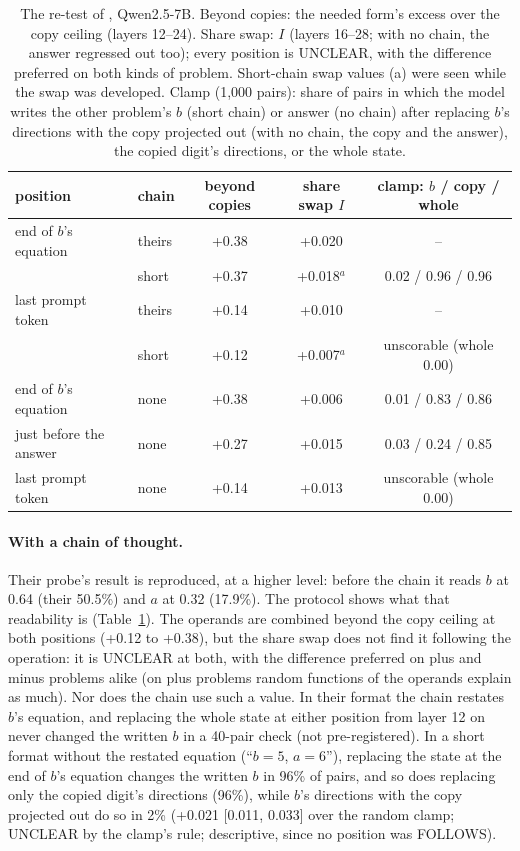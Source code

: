 \documentclass{article}
\begin{document}
\begin{table}[t]
\centering
\caption{The re-test of \citet{kudo2026}, Qwen2.5-7B. Beyond copies: the needed form's excess over the copy ceiling (layers 12--24). Share swap: $I$ (layers 16--28; with no chain, the answer regressed out too); every position is UNCLEAR, with the difference preferred on both kinds of problem. Short-chain swap values (a) were seen while the swap was developed. Clamp (1,000 pairs): share of pairs in which the model writes the other problem's $b$ (short chain) or answer (no chain) after replacing $b$'s directions with the copy projected out (with no chain, the copy and the answer), the copied digit's directions, or the whole state.}
\label{tab:kudo}
\small
\begin{tabular}{@{}llccc@{}}
\toprule
position & chain & beyond copies & share swap $I$ & clamp: $b$ / copy / whole \\
\midrule
end of $b$'s equation & theirs & +0.38 & +0.020 & -- \\
 & short & +0.37 & +0.018$^a$ & 0.02 / 0.96 / 0.96 \\
last prompt token & theirs & +0.14 & +0.010 & -- \\
 & short & +0.12 & +0.007$^a$ & unscorable (whole 0.00) \\
\midrule
end of $b$'s equation & none & +0.38 & +0.006 & 0.01 / 0.83 / 0.86 \\
just before the answer & none & +0.27 & +0.015 & 0.03 / 0.24 / 0.85 \\
last prompt token & none & +0.14 & +0.013 & unscorable (whole 0.00) \\
\bottomrule
\end{tabular}
\end{table}

\paragraph{With a chain of thought.} Their probe's result is reproduced, at a higher level: before the chain it reads $b$ at 0.64 (their 50.5\%) and $a$ at 0.32 (17.9\%). The protocol shows what that readability is (Table~\ref{tab:kudo}). The operands are combined beyond the copy ceiling at both positions (+0.12 to +0.38), but the share swap does not find it following the operation: it is UNCLEAR at both, with the difference preferred on plus and minus problems alike (on plus problems random functions of the operands explain as much). Nor does the chain use such a value. In their format the chain restates $b$'s equation, and replacing the whole state at either position from layer 12 on never changed the written $b$ in a 40-pair check (not pre-registered). In a short format without the restated equation (``$b = 5$, $a = 6$''), replacing the state at the end of $b$'s equation changes the written $b$ in 96\% of pairs, and so does replacing only the copied digit's directions (96\%), while $b$'s directions with the copy projected out do so in 2\% (+0.021 [0.011, 0.033] over the random clamp; UNCLEAR by the clamp's rule; descriptive, since no position was FOLLOWS).
\end{document}
